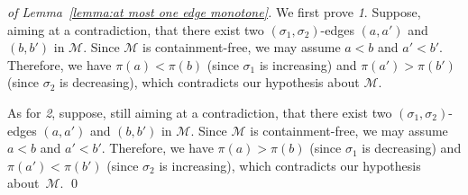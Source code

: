 \documentclass[a4paper]{llncs}
\begin{document}
\bigskip

\begin{proof}[of Lemma~\ref{lemma:at most one edge monotone}]
  We first prove \emph{1}. Suppose, aiming at a contradiction, that
  there exist two $(\sigma_1, \sigma_2)$-edges $(a, a')$ and $(b, b')$
  in $\mathcal{M}$. Since $\mathcal{M}$ is containment-free, we may
  assume $a < b$ and $a' < b'$. Therefore, we have $\pi(a) < \pi(b)$
  (since $\sigma_1$ is increasing) and $\pi(a') > \pi(b')$ (since
  $\sigma_2$ is decreasing), which contradicts our hypothesis about
  $\mathcal{M}$.

  As for \emph{2}, suppose, still aiming at a contradiction, that there
  exist two $(\sigma_1, \sigma_2)$-edges $(a, a')$ and $(b, b')$ in
  $\mathcal{M}$. Since $\mathcal{M}$ is containment-free, we may assume
  $a < b$ and $a' < b'$. Therefore, we have $\pi(a) > \pi(b)$ (since
  $\sigma_1$ is decreasing) and $\pi(a') < \pi(b')$ (since $\sigma_2$ is
  increasing), which contradicts our hypothesis about~$\mathcal{M}$.
  \qed
\end{proof}
\bigskip

\end{document}
